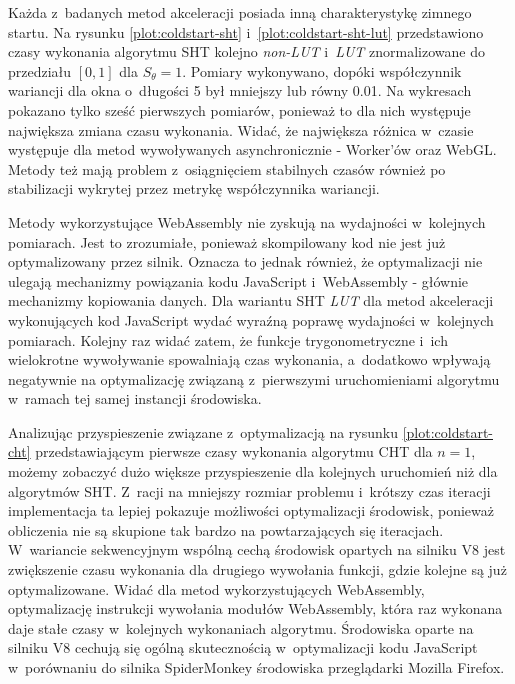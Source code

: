 Każda z~badanych metod akceleracji posiada inną charakterystykę zimnego startu. Na rysunku \ref{plot:coldstart-sht} i~\ref{plot:coldstart-sht-lut} przedstawiono czasy wykonania algorytmu SHT kolejno \textit{non-LUT} i~\textit{LUT} znormalizowane do przedziału $\left[0, 1\right]$ dla $S_\theta=1$. Pomiary wykonywano, dopóki współczynnik wariancji dla okna o~długości 5 był mniejszy lub równy 0.01. Na wykresach pokazano tylko sześć pierwszych pomiarów, ponieważ to dla nich występuje największa zmiana czasu wykonania. Widać, że największa różnica w~czasie występuje dla metod wywoływanych asynchronicznie - Worker'ów oraz WebGL. Metody też mają problem z~osiągnięciem stabilnych czasów również po stabilizacji wykrytej przez metrykę współczynnika wariancji.

Metody wykorzystujące WebAssembly nie zyskują na wydajności w~kolejnych pomiarach. Jest to zrozumiałe, ponieważ skompilowany kod nie jest już optymalizowany przez silnik. Oznacza to jednak również, że optymalizacji nie ulegają mechanizmy powiązania kodu JavaScript i~WebAssembly - głównie mechanizmy kopiowania danych. Dla wariantu SHT \textit{LUT} dla metod akceleracji wykonujących kod JavaScript wydać wyraźną poprawę wydajności w~kolejnych pomiarach. Kolejny raz widać zatem, że funkcje trygonometryczne i~ich wielokrotne wywoływanie spowalniają czas wykonania, a~dodatkowo wpływają negatywnie na optymalizację związaną z~pierwszymi uruchomieniami algorytmu w~ramach tej samej instancji środowiska.





Analizując przyspieszenie związane z~optymalizacją na rysunku \ref{plot:coldstart-cht} przedstawiającym pierwsze czasy wykonania algorytmu CHT dla $n=1$, możemy zobaczyć dużo większe przyspieszenie dla kolejnych uruchomień niż dla algorytmów SHT. Z~racji na mniejszy rozmiar problemu i~krótszy czas iteracji implementacja ta lepiej pokazuje możliwości optymalizacji środowisk, ponieważ obliczenia nie są skupione tak bardzo na powtarzających się iteracjach. W~wariancie sekwencyjnym wspólną cechą środowisk opartych na silniku V8 jest zwiększenie czasu wykonania dla drugiego wywołania funkcji, gdzie kolejne są już optymalizowane. Widać dla metod wykorzystujących WebAssembly, optymalizację instrukcji wywołania modułów WebAssembly, która raz wykonana daje stałe czasy w~kolejnych wykonaniach algorytmu. Środowiska oparte na silniku V8 cechują się ogólną skutecznością w~optymalizacji kodu JavaScript w~porównaniu do silnika SpiderMonkey środowiska przeglądarki Mozilla Firefox.

